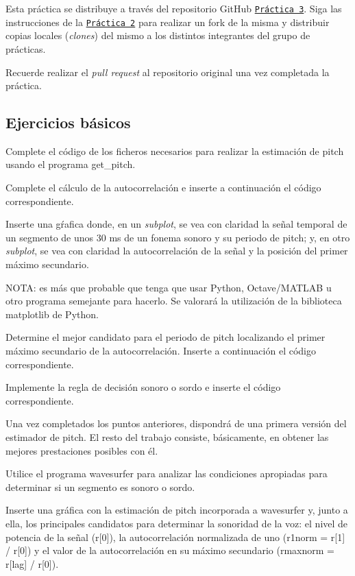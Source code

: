Esta práctica se distribuye a través del repositorio Git\+Hub \href{https://github.com/albino-pav/P3}{\tt Práctica 3}. Siga las instrucciones de la \href{https://github.com/albino-pav/P2}{\tt Práctica 2} para realizar un {\ttfamily fork} de la misma y distribuir copias locales ({\itshape clones}) del mismo a los distintos integrantes del grupo de prácticas.

Recuerde realizar el {\itshape pull request} al repositorio original una vez completada la práctica.

\subsection*{Ejercicios básicos }


\begin{DoxyItemize}
\item Complete el código de los ficheros necesarios para realizar la estimación de pitch usando el programa {\ttfamily get\+\_\+pitch}.
\begin{DoxyItemize}
\item Complete el cálculo de la autocorrelación e inserte a continuación el código correspondiente.
\item Inserte una gŕafica donde, en un {\itshape subplot}, se vea con claridad la señal temporal de un segmento de unos 30 ms de un fonema sonoro y su periodo de pitch; y, en otro {\itshape subplot}, se vea con claridad la autocorrelación de la señal y la posición del primer máximo secundario.

N\+O\+TA\+: es más que probable que tenga que usar Python, Octave/\+M\+A\+T\+L\+AB u otro programa semejante para hacerlo. Se valorará la utilización de la biblioteca matplotlib de Python.
\item Determine el mejor candidato para el periodo de pitch localizando el primer máximo secundario de la autocorrelación. Inserte a continuación el código correspondiente.
\item Implemente la regla de decisión sonoro o sordo e inserte el código correspondiente.
\end{DoxyItemize}
\item Una vez completados los puntos anteriores, dispondrá de una primera versión del estimador de pitch. El resto del trabajo consiste, básicamente, en obtener las mejores prestaciones posibles con él.
\begin{DoxyItemize}
\item Utilice el programa {\ttfamily wavesurfer} para analizar las condiciones apropiadas para determinar si un segmento es sonoro o sordo.
\begin{DoxyItemize}
\item Inserte una gráfica con la estimación de pitch incorporada a {\ttfamily wavesurfer} y, junto a ella, los principales candidatos para determinar la sonoridad de la voz\+: el nivel de potencia de la señal (r\mbox{[}0\mbox{]}), la autocorrelación normalizada de uno (r1norm = r\mbox{[}1\mbox{]} / r\mbox{[}0\mbox{]}) y el valor de la autocorrelación en su máximo secundario (rmaxnorm = r\mbox{[}lag\mbox{]} / r\mbox{[}0\mbox{]}).


\end{DoxyItemize}
\end{DoxyItemize}
\end{DoxyItemize}
